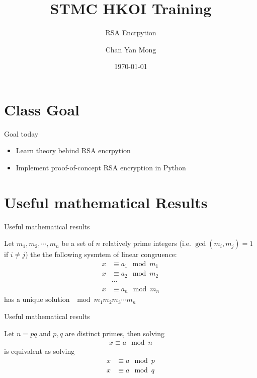 \documentclass[10pt,xcolor={table,dvipsnames},t]{beamer}
\title[Your Short Title]{STMC HKOI Training}
\subtitle{RSA Encrpytion}
\author{Chan Yan Mong}
\date{\today}
\begin{document}
\begin{frame}
  \titlepage
\end{frame}


\section{Class Goal}

\begin{frame}{Goal today}

\begin{itemize}
  \item Learn theory behind RSA encrpytion
  \item Implement proof-of-concept RSA encryption in Python
\end{itemize}

\end{frame}


\section{Useful mathematical Results}
\begin{frame}{Useful mathematical results}
    \begin{theorem}
      Let $m_1,m_2,\cdots,m_n$ be a set of $n$ relatively prime integers (i.e. $\gcd(m_i,m_j) = 1$ if $i\neq j$) the the following sysmtem of linear congruence:
      \begin{align*}
          x &\equiv a_1 \mod m_1\\
          x &\equiv a_2 \mod m_2\\
          &\cdots\\
          x &\equiv a_n \mod m_n 
      \end{align*}
      has a unique solution $\mod m_1 m_2m_3\cdots m_n$
    \end{theorem}
\end{frame}

\begin{frame}{Useful mathematical results}
  \begin{corollary}[]
    Let $n=pq$ and $p,q$ are distinct primes, then solving  
    \begin{align*}
      x \equiv a \mod n
    \end{align*}
    is equivalent as solving
    \begin{align*}
      x &\equiv a \mod p \\
      x &\equiv a \mod q
    \end{align*}
  \end{corollary}
\end{frame}
\end{document}
